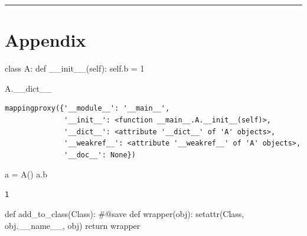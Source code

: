 \documentclass[
  a4paper,
]{book}
\newenvironment{Shaded}{\begin{snugshade}}{\end{snugshade}}
\newcommand{\BuiltInTok}[1]{\textcolor[rgb]{0.00,0.23,0.31}{#1}}
\newcommand{\CommentTok}[1]{\textcolor[rgb]{0.37,0.37,0.37}{#1}}
\newcommand{\ControlFlowTok}[1]{\textcolor[rgb]{0.00,0.23,0.31}{#1}}
\newcommand{\DecValTok}[1]{\textcolor[rgb]{0.68,0.00,0.00}{#1}}
\newcommand{\FunctionTok}[1]{\textcolor[rgb]{0.28,0.35,0.67}{#1}}
\newcommand{\KeywordTok}[1]{\textcolor[rgb]{0.00,0.23,0.31}{#1}}
\newcommand{\NormalTok}[1]{\textcolor[rgb]{0.00,0.23,0.31}{#1}}
\newcommand{\OperatorTok}[1]{\textcolor[rgb]{0.37,0.37,0.37}{#1}}
\newcommand{\VariableTok}[1]{\textcolor[rgb]{0.07,0.07,0.07}{#1}}
\numberwithin{equation}{section}
\theoremstyle{plain}
\theoremstyle{remark}
\begin{document}
\begin{center}\rule{0.5\linewidth}{0.5pt}\end{center}


\hypertarget{appendix}{%
\chapter{Appendix}\label{appendix}}

\begin{Shaded}
\begin{Highlighting}[]
\KeywordTok{class}\NormalTok{ A:}
    \KeywordTok{def} \FunctionTok{\_\_init\_\_}\NormalTok{(}\VariableTok{self}\NormalTok{):}
        \VariableTok{self}\NormalTok{.b }\OperatorTok{=} \DecValTok{1}
\end{Highlighting}
\end{Shaded}

\begin{Shaded}
\begin{Highlighting}[]
\NormalTok{A.\_\_dict\_\_}
\end{Highlighting}
\end{Shaded}

\begin{verbatim}
mappingproxy({'__module__': '__main__',
              '__init__': <function __main__.A.__init__(self)>,
              '__dict__': <attribute '__dict__' of 'A' objects>,
              '__weakref__': <attribute '__weakref__' of 'A' objects>,
              '__doc__': None})
\end{verbatim}

\begin{Shaded}
\begin{Highlighting}[]
\NormalTok{a }\OperatorTok{=}\NormalTok{ A()}
\NormalTok{a.b}
\end{Highlighting}
\end{Shaded}

\begin{verbatim}
1
\end{verbatim}

\begin{Shaded}
\begin{Highlighting}[]
\KeywordTok{def}\NormalTok{ add\_to\_class(Class):  }\CommentTok{\#@save}
    \KeywordTok{def}\NormalTok{ wrapper(obj):}
        \BuiltInTok{setattr}\NormalTok{(Class, obj.}\VariableTok{\_\_name\_\_}\NormalTok{, obj)}
    \ControlFlowTok{return}\NormalTok{ wrapper}
\end{Highlighting}
\end{Shaded}
\end{document}
